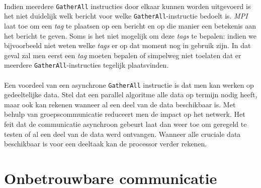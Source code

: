 \paragraph{}
Indien meerdere \texttt{GatherAll} instructies door elkaar kunnen worden uitgevoerd is het niet duidelijk welk bericht voor welke \texttt{GatherAll}-instructie bedoelt is. \emph{MPI} laat toe om een \emph{tag} te plaatsen op een bericht en op die manier een betekenis aan het bericht te geven. Soms is het niet mogelijk om deze \emph{tags} te bepalen: indien we bijvoorbeeld niet weten welke \emph{tags} er op dat moment nog in gebruik zijn. In dat geval zal men eerst een \emph{tag} moeten bepalen of simpelweg niet toelaten dat er meerdere \texttt{GatherAll}-instructies tegelijk plaatsvinden.

\paragraph{}
Een voordeel van een asynchrone \texttt{GatherAll} instructie is dat men kan werken op gedeeltelijke data. Stel dat een parallel algoritme alle data op termijn nodig heeft, maar ook kan rekenen wanneer al een deel van de data beschikbaar is. Met behulp van groepscommunicatie reduceert men de impact op het netwerk. Het feit dat de communicatie asynchroon gebeurt laat dan weer toe om geregeld te testen of al een deel van de data werd ontvangen. Wanneer alle cruciale data beschikbaar is voor een deeltaak kan de processor verder rekenen.


\section{Onbetrouwbare communicatie}




